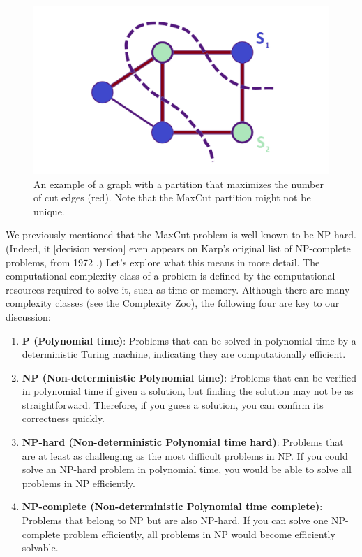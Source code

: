 \begin{figure}[H]
  \centering
  \includegraphics[width=\textwidth]{Figures/Diagrams/MaxCut.png}
  \caption{An example of a graph with a partition that maximizes the number of cut edges (red). Note that the MaxCut partition might not be unique.}
  \label{fig:MaxCut}
\end{figure}

We previously mentioned that the MaxCut problem is well-known to be NP-hard. (Indeed, it [decision version] even appears on Karp's original list of NP-complete problems, from 1972 \cite{Karp2010}.) Let's explore what this means in more detail. The computational complexity class of a problem is defined by the computational resources required to solve it, such as time or memory. Although there are many complexity classes (see the \href{https://complexityzoo.net/Complexity_Zoo}{Complexity Zoo}), the following four are key to our discussion:

\begin{enumerate}
  \item \textbf{P (Polynomial time)}: Problems that can be solved in polynomial time by a deterministic Turing machine, indicating they are computationally efficient.
  \item \textbf{NP (Non-deterministic Polynomial time)}: Problems that can be verified in polynomial time if given a solution, but finding the solution may not be as straightforward. Therefore, if you guess a solution, you can confirm its correctness quickly.
  \item \textbf{NP-hard (Non-deterministic Polynomial time hard)}: Problems that are at least as challenging as the most difficult problems in NP. If you could solve an NP-hard problem in polynomial time, you would be able to solve all problems in NP efficiently.
  \item \textbf{NP-complete (Non-deterministic Polynomial time complete)}: Problems that belong to NP but are also NP-hard. If you can solve one NP-complete problem efficiently, all problems in NP would become efficiently solvable.
\end{enumerate}

